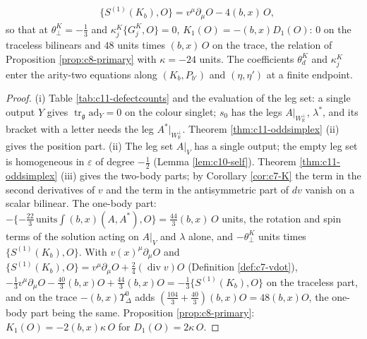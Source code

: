 \begin{proposition}
\begin{itemize}
\[\begin{aligned}
&\{S^{(1)}(K_b),O\}=v^\mu\partial_\mu O-4(b,x)\,O,
\end{aligned}
\]
so that at $\theta^K_\perp=-\tfrac13$ and $\kappa^K_j\{G^K_j,O\}=0$, $K_1(O)=-(b,x)D_1(O)$: $0$ on the traceless bilinears and $48$ units times $(b,x)\,O$ on the trace, the relation of Proposition \ref{prop:c8-primary} with $\kappa=-24$ units. The coefficients $\theta^K_d$ and $\kappa^K_j$ enter the arity-two equations along $(K_b,P_{b'})$ and $(\eta,\eta')$ at a finite endpoint.
\end{itemize}
\end{proposition}

\begin{proof}
(i) Table \ref{tab:c11-defectcounts} and the evaluation of the leg set: a single output $Y$ gives $\operatorname{tr}_{\mathfrak g}\mathrm{ad}_Y=0$ on the colour singlet; $s_0$ has the legs $A|_{W_{\mathbb R}^\perp}$, $\lambda^*$, and its bracket with a letter needs the leg $A^*|_{W_{\mathbb R}^\perp}$. Theorem \ref{thm:c11-oddsimplex} (ii) gives the position part. (ii) The leg set $A|_V$ has a single output; the empty leg set is homogeneous in $\varepsilon$ of degree $-\tfrac12$ (Lemma \ref{lem:c10-self}). Theorem \ref{thm:c11-oddsimplex} (iii) gives the two-body parts; by Corollary \ref{cor:c7-K} the term in the second derivatives of $v$ and the term in the antisymmetric part of $dv$ vanish on a scalar bilinear. The one-body part: $-\{-\tfrac{22}3\,\text{units}\int(b,x)(A,A^*),O\}=\tfrac{44}3(b,x)\,O$ units, the rotation and spin terms of the solution acting on $A|_V$ and $\lambda$ alone, and $-\theta^K_\perp$ units times $\{S^{(1)}(K_b),O\}$. With $v(x)^\mu\partial_\mu O$ and $\{S^{(1)}(K_b),O\}=v^\mu\partial_\mu O+\tfrac24(\operatorname{div}v)O$ (Definition \ref{def:c7-vdot}), $-\tfrac13v^\mu\partial_\mu O-\tfrac{40}3(b,x)O+\tfrac{44}3(b,x)O=-\tfrac13\{S^{(1)}(K_b),O\}$ on the traceless part, and on the trace $-(b,x)\Upsilon^0_\Delta$ adds $(\tfrac{104}3+\tfrac{40}3)(b,x)O=48(b,x)O$, the one-body part being the same. Proposition \ref{prop:c8-primary}: $K_1(O)=-2(b,x)\kappa\,O$ for $D_1(O)=2\kappa\,O$.
\end{proof}

